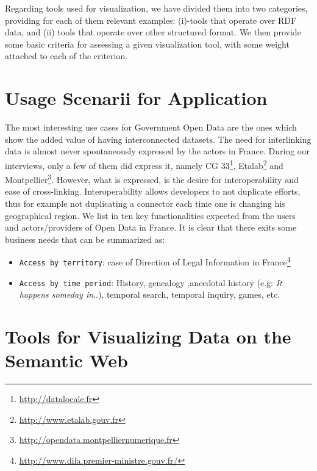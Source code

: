 \documentclass[a4paper,11pt]{report}
\begin{document}
Regarding tools used for visualization, we have divided them into two categories, providing for each of them relevant examples: (i)-tools that operate over RDF data, and (ii) tools that operate over other structured format. We then provide some basic criteria for assessing a given visualization tool, with some weight attached to each of the criterion. 


 \section{Usage Scenarii for Application}
 The most interesting use cases for Government Open Data are the ones which show the added value of having interconnected datasets. The need for interlinking data is almost never spontaneously expressed by the actors in France. During our interviews, only a few of them did express it, namely CG 33\footnote{\url{http://datalocale.fr}}, Etalab\footnote{\url{http://www.etalab.gouv.fr}} and Montpellier\footnote{\url{http://opendata.montpelliernumerique.fr}}. However, what is expressed, is the desire for interoperability and ease of cross-linking. Interoperability allows developers to not duplicate efforts, thus for example not duplicating a connector each time one is changing his geographical region. We list in \cite{deliverable2012a} ten key functionalities expected from the users and actors/providers of Open Data in France. It is clear that there exits some business needs that can be summarized as:
\begin{itemize}
\item \texttt{Access by territory}: case of Direction of Legal Information in France\footnote{\url{http://www.dila.premier-ministre.gouv.fr/}}
\item \texttt{Access by time period}: History, genealogy ,anecdotal history (e.g: \textit{It happens someday in}..), temporal search, temporal inquiry, games, etc.
\end{itemize}
 


\section{Tools for Visualizing Data on the Semantic Web}
 
\end{document}

